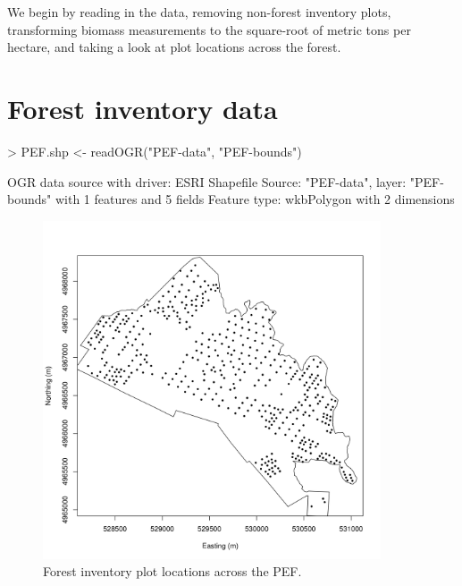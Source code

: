 \documentclass{article}
\begin{document}
We begin by reading in the data, removing non-forest inventory plots, transforming biomass measurements to the square-root of metric tons per hectare, and taking a look at plot locations across the forest.

\section{Forest inventory data}
\begin{Schunk}
\begin{Sinput}
> PEF.shp <- readOGR("PEF-data", "PEF-bounds")
\end{Sinput}
\begin{Soutput}
OGR data source with driver: ESRI Shapefile 
Source: "PEF-data", layer: "PEF-bounds"
with 1 features and 5 fields
Feature type: wkbPolygon with 2 dimensions
\end{Soutput}
\end{Schunk}

\begin{figure}
\begin{center}
\includegraphics[width=10cm]{figures/fig-coords}
\end{center}
\caption{Forest inventory plot locations across the PEF.}
\label{fig:fig-coords}
\end{figure}
\end{document}
